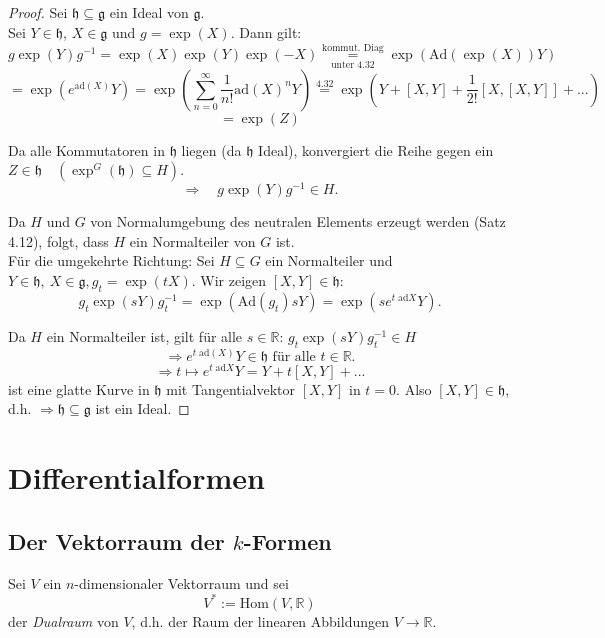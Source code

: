 \documentclass[fleqn, 12pt, letterpaper]{article}
\newcommand{\txt}[1]{\text{#1}}
\begin{document}
\begin{proof}
Sei \( \mathfrak{h} \subseteq \mathfrak{g} \) ein Ideal von \( \mathfrak{g} \).\\
Sei \( Y \in \mathfrak{h} \), \( X \in \mathfrak{g} \) und \( g = \exp(X) \). Dann gilt:
\[
g \exp(Y) g^{-1}
= \exp(X) \exp(Y) \exp(-X)
\underset{\txt{unter 4.32}}{\overset{\txt{kommut. Diag}}{=}} \exp\left( \mathrm{Ad}(\exp(X)) Y \right)
\]
\[= \exp\left( e^{\mathrm{ad}(X)} Y \right)
= \exp\left( \sum_{n=0}^{\infty} \frac{1}{n!} \mathrm{ad}(X)^n Y \right)\overset{4.32}{=}\exp(Y+[X,Y]+\frac{1}{2!}[X,[X,Y]]+...)\]
\[=\exp(Z)\]

Da alle Kommutatoren in \(\mathfrak{h} \) liegen (da $\mathfrak{h}$ Ideal), konvergiert die Reihe gegen ein \( Z \in \mathfrak{h} \quad (\exp^G(\mathfrak{h})\subseteq H) \).
\[
\Rightarrow \quad g \exp(Y) g^{-1} \in H.
\]

Da \( H \) und \( G \) von Normalumgebung des neutralen Elements erzeugt werden (Satz 4.12), folgt, dass \( H \) ein Normalteiler von \( G \) ist.\\

Für die umgekehrte Richtung: Sei \( H \subseteq G \) ein Normalteiler und \( Y \in \mathfrak{h},\ X \in \mathfrak{g}, g_t = \exp(tX)
\). Wir zeigen $[X,Y]\in\mathfrak{h}$:
\[
g_t \exp(sY) g_t^{-1} =\exp(\mathrm{Ad}(g_t)sY)=\exp(se^{t\;\mathrm{ad}X}Y).
\]

Da \( H \) ein Normalteiler ist, gilt für alle $s\in\mathbb{R}$: \(
g_t \exp(sY) g_t^{-1} \in H \quad 
\)
\[\Rightarrow e^{t\;\mathrm{ad}(X)}Y\in\mathfrak{h }\text{ für alle } t \in \mathbb{R}.\]
\[
\Rightarrow t \mapsto e^{t\;\mathrm{ad}X}Y=Y+t[X,Y]+...
\]
ist eine glatte Kurve in \( \mathfrak{h} \) mit Tangentialvektor
\(
[X, Y] \text{ in } t = 0.
\) Also \( [X, Y] \in \mathfrak{h} \), d.h.
\(\Rightarrow \mathfrak{h}\subseteq\mathfrak{g}\) ist ein Ideal.

\end{proof}


\section{Differentialformen}

\subsection{Der Vektorraum der $k$-Formen}

Sei \( V \) ein \( n \)-dimensionaler Vektorraum und sei
\[
V^* := \mathrm{Hom}(V, \mathbb{R})
\]
der \emph{Dualraum} von \( V \), d.h. der Raum der linearen Abbildungen \( V \to \mathbb{R} \).
\end{document}
